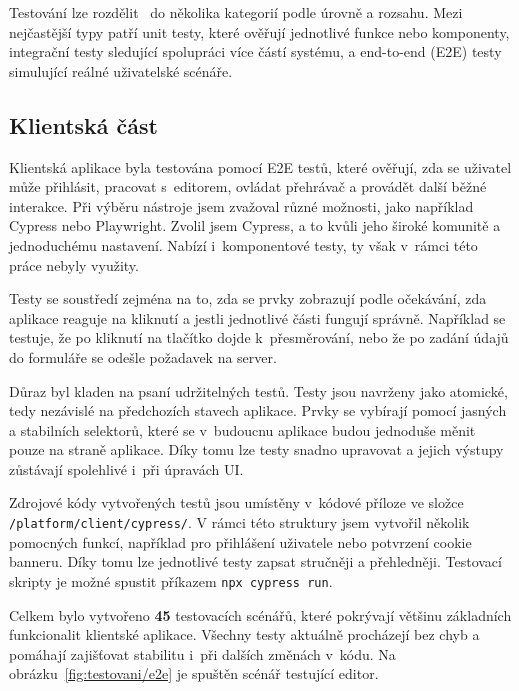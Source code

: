 Testování lze rozdělit~\cite{meszaros_2007} do několika kategorií podle úrovně a rozsahu. 
Mezi nejčastější typy patří unit testy, které ověřují jednotlivé funkce nebo komponenty, integrační testy sledující spolupráci více částí systému, a end-to-end (E2E) testy simulující reálné uživatelské scénáře. 

\subsection{Klientská část}

Klientská aplikace byla testována pomocí E2E testů, které ověřují, zda se uživatel může přihlásit, pracovat s~editorem, ovládat přehrávač a provádět další běžné interakce. 
Při výběru nástroje jsem zvažoval různé možnosti, jako například Cypress nebo Playwright. 
Zvolil jsem Cypress, a to kvůli jeho široké komunitě a jednoduchému nastavení.
Nabízí i~komponentové testy, ty však v~rámci této práce nebyly využity.

Testy se soustředí zejména na to, zda se prvky zobrazují podle očekávání, zda aplikace reaguje na kliknutí a jestli jednotlivé části fungují správně.
Například se testuje, že po kliknutí na tlačítko dojde k~přesměrování, nebo že po zadání údajů do formuláře se odešle požadavek na server.

Důraz byl kladen na psaní udržitelných testů. 
Testy jsou navrženy jako atomické, tedy nezávislé na předchozích stavech aplikace. 
Prvky se vybírají pomocí jasných a stabilních selektorů, které se v~budoucnu aplikace budou jednoduše měnit pouze na straně aplikace.
Díky tomu lze testy snadno upravovat a jejich výstupy zůstávají spolehlivé i~při úpravách UI.


Zdrojové kódy vytvořených testů jsou umístěny v~kódové příloze ve složce \texttt{/platform/client/cypress/}. 
V rámci této struktury jsem vytvořil několik pomocných funkcí, například pro přihlášení uživatele nebo potvrzení cookie banneru. 
Díky tomu lze jednotlivé testy zapsat stručněji a přehledněji.
Testovací skripty je možné spustit příkazem \verb|npx cypress run|.

Celkem bylo vytvořeno \textbf{45} testovacích scénářů, které pokrývají většinu základních funkcionalit klientské aplikace. 
Všechny testy aktuálně procházejí bez chyb a pomáhají zajišťovat stabilitu i~při dalších změnách v~kódu.
Na obrázku~\ref{fig:testovani/e2e} je spuštěn scénář testující editor.

